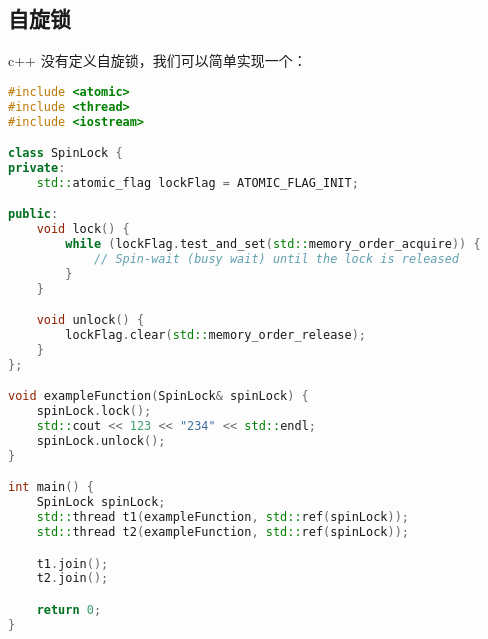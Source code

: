 \subsection{自旋锁}
c++ 没有定义自旋锁，我们可以简单实现一个：
\begin{lstlisting}[language=cpp]
#include <atomic>
#include <thread>
#include <iostream>

class SpinLock {
private:
    std::atomic_flag lockFlag = ATOMIC_FLAG_INIT;

public:
    void lock() {
        while (lockFlag.test_and_set(std::memory_order_acquire)) {
            // Spin-wait (busy wait) until the lock is released
        }
    }

    void unlock() {
        lockFlag.clear(std::memory_order_release);
    }
};

void exampleFunction(SpinLock& spinLock) {
    spinLock.lock();
    std::cout << 123 << "234" << std::endl;
    spinLock.unlock();
}

int main() {
    SpinLock spinLock;
    std::thread t1(exampleFunction, std::ref(spinLock));
    std::thread t2(exampleFunction, std::ref(spinLock));

    t1.join();
    t2.join();

    return 0;
}
\end{lstlisting}
